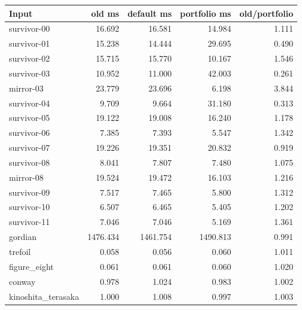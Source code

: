 \begin{center}\small
\begin{tabular}{@{}lrrrr@{}}
\toprule
Input & old ms & default ms & portfolio ms & old/portfolio \\
\midrule
survivor-00 & 16.692 & 16.581 & 14.984 & 1.111 \\
survivor-01 & 15.238 & 14.444 & 29.695 & 0.490 \\
survivor-02 & 15.715 & 15.770 & 10.167 & 1.546 \\
survivor-03 & 10.952 & 11.000 & 42.003 & 0.261 \\
mirror-03 & 23.779 & 23.696 & 6.198 & 3.844 \\
survivor-04 & 9.709 & 9.664 & 31.180 & 0.313 \\
survivor-05 & 19.122 & 19.008 & 16.240 & 1.178 \\
survivor-06 & 7.385 & 7.393 & 5.547 & 1.342 \\
survivor-07 & 19.226 & 19.351 & 20.832 & 0.919 \\
survivor-08 & 8.041 & 7.807 & 7.480 & 1.075 \\
mirror-08 & 19.524 & 19.472 & 16.103 & 1.216 \\
survivor-09 & 7.517 & 7.465 & 5.800 & 1.312 \\
survivor-10 & 6.507 & 6.465 & 5.405 & 1.202 \\
survivor-11 & 7.046 & 7.046 & 5.169 & 1.361 \\
gordian & 1476.434 & 1461.754 & 1490.813 & 0.991 \\
trefoil & 0.058 & 0.056 & 0.060 & 1.011 \\
figure\_eight & 0.061 & 0.061 & 0.060 & 1.020 \\
conway & 0.978 & 1.024 & 0.983 & 1.002 \\
kinoshita\_terasaka & 1.000 & 1.008 & 0.997 & 1.003 \\
\bottomrule
\end{tabular}
\end{center}
